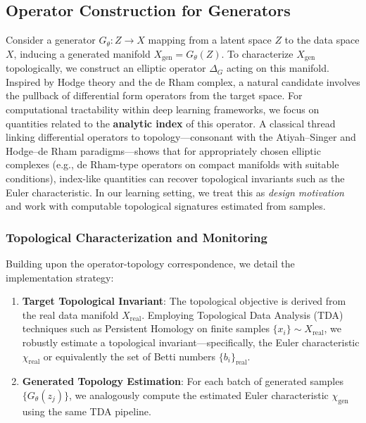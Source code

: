 \documentclass[10pt,leqno]{amsart}
\begin{document}
\subsection{Operator Construction for Generators}
Consider a generator $G_\theta: Z \to X$ mapping from a latent space $Z$ to the data space $X$, inducing a generated manifold $X_{\text{gen}} = G_\theta(Z)$. To characterize $X_{\text{gen}}$ topologically, we construct an elliptic operator $\Delta_{G}$ acting on this manifold. Inspired by Hodge theory and the de Rham complex, a natural candidate involves the pullback of differential form operators from the target space. For computational tractability within deep learning frameworks, we focus on quantities related to the \textbf{analytic index} of this operator.
A classical thread linking differential operators to topology---consonant with the Atiyah--Singer and Hodge--de Rham paradigms---shows that for appropriately chosen elliptic complexes (e.g., de Rham-type operators on compact manifolds with suitable conditions), index-like quantities can recover topological invariants such as the Euler characteristic. In our learning setting, we treat this as \emph{design motivation} and work with computable topological signatures estimated from samples.

\subsubsection{Topological Characterization and Monitoring}
Building upon the operator-topology correspondence, we detail the implementation strategy:
\begin{enumerate}
    \item \textbf{Target Topological Invariant}: The topological objective is derived from the real data manifold $X_{\text{real}}$. Employing Topological Data Analysis (TDA) techniques such as Persistent Homology on finite samples $\{x_i\} \sim X_{\text{real}}$, we robustly estimate a topological invariant---specifically, the Euler characteristic $\chi_{\text{real}}$ or equivalently the set of Betti numbers $\{b_i\}_{\text{real}}$.
    
    \item \textbf{Generated Topology Estimation}: For each batch of generated samples $\{G_\theta(z_j)\}$, we analogously compute the estimated Euler characteristic $\chi_{\text{gen}}$ using the same TDA pipeline.
\end{enumerate}
\end{document}
